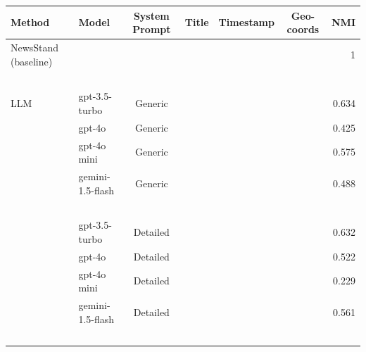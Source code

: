 


\begin{table}[ht!]
    \centering
    \begin{tabular}{l|l|cccc|r}
        \textbf{Method}       & \textbf{Model}    & \textbf{System Prompt} & \textbf{Title} & \textbf{Timestamp} & \textbf{Geo-coords} &\textbf{NMI} \\
        \hline
        NewsStand (baseline)  & ~                 & ~                      & ~              & ~                  & ~                    & 1 \\
        ~                     & ~                 & ~                      & ~              & ~                  & ~                    & ~   \\
        LLM                   & gpt-3.5-turbo     & Generic                & ~              & ~                  & ~                    & 0.634 \\
        ~                     & gpt-4o            & Generic                & ~              & ~                  & ~                    & 0.425 \\
        ~                     & gpt-4o mini       & Generic                & ~              & ~                  & ~                    & 0.575 \\
        ~                     & gemini-1.5-flash  & Generic                & ~              & ~                  & ~                    & 0.488 \\
        ~                     & ~                 & ~                      & ~              & ~                  & ~                    & ~   \\
        ~                     & gpt-3.5-turbo     & Detailed               & ~              & ~                  & ~                    & 0.632 \\
        ~                     & gpt-4o            & Detailed               & ~              & ~                  & ~                    & 0.522 \\
        ~                     & gpt-4o mini       & Detailed               & ~              & ~                  & ~                    & 0.229 \\
        ~                     & gemini-1.5-flash  & Detailed               & ~              & ~                  & ~                    & 0.561 \\
        ~                     & ~                 & ~                      & ~              & ~                  & ~                    & ~   \\

\end{tabular}
\end{table}
